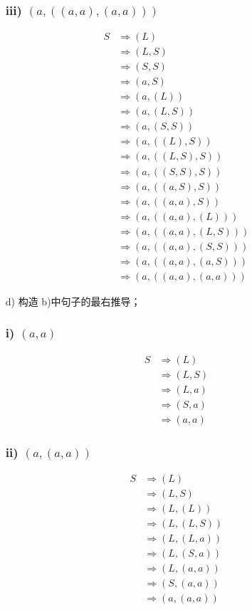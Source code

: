 \documentclass[a4paper, body={18cm,22cm}]{article}
\begin{document}
\begin{enumerate}
\subsubsection*{iii) $(a, ((a, a), (a, a)))$}
\begin{align*}
S &\Rightarrow (L) \\
&\Rightarrow (L,S) \\
&\Rightarrow (S,S) \\
&\Rightarrow (a,S) \\
&\Rightarrow (a,(L)) \\
&\Rightarrow (a,(L,S)) \\
&\Rightarrow (a,(S,S)) \\
&\Rightarrow (a,((L),S)) \\
&\Rightarrow (a,((L,S),S)) \\
&\Rightarrow (a,((S,S),S)) \\
&\Rightarrow (a,((a,S),S)) \\
&\Rightarrow (a,((a,a),S)) \\
&\Rightarrow (a,((a,a),(L))) \\
&\Rightarrow (a,((a,a),(L,S))) \\
&\Rightarrow (a,((a,a),(S,S))) \\
&\Rightarrow (a,((a,a),(a,S))) \\
&\Rightarrow (a,((a,a),(a,a)))
\end{align*}
    \item[d)] 构造 b)中句子的最右推导； 
    
    \subsubsection*{i) $(a, a)$}
\begin{align*}
S &\Rightarrow (L) \\
&\Rightarrow (L,S) \\
&\Rightarrow (L,a) \\
&\Rightarrow (S,a) \\
&\Rightarrow (a,a)
\end{align*}

\subsubsection*{ii) $(a, (a, a))$}
\begin{align*}
S &\Rightarrow (L) \\
&\Rightarrow (L,S) \\
&\Rightarrow (L,(L)) \\
&\Rightarrow (L,(L,S)) \\
&\Rightarrow (L,(L,a)) \\
&\Rightarrow (L,(S,a)) \\
&\Rightarrow (L,(a,a)) \\
&\Rightarrow (S,(a,a)) \\
&\Rightarrow (a,(a,a))
\end{align*}


\end{enumerate}
\end{document}
